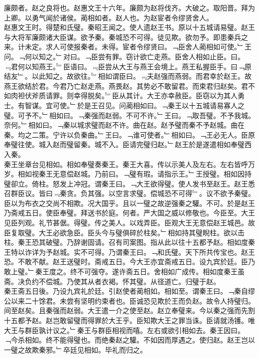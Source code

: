 \documentclass{zhvt-classic}
\begin{document}

\hspace*{2em}廉颇者。赵之良将也。赵惠文王十六年。廉颇为赵将伐齐。大破之。取阳晋。拜为上卿。以勇气闻於诸侯。蔺相如者。赵人也。为赵宦者令缪贤舍人。\\
\hspace*{2em}赵惠文王时。得楚和氏璧。秦昭王闻之。使人遗赵王书。原以十五城请易璧。赵王与大将军廉颇诸大臣谋。欲予秦。秦城恐不可得。徒见欺。欲勿予。即患秦兵之来。计未定。求人可使报秦者。未得。宦者令缪贤曰。﹁臣舍人蔺相如可使。﹂王问。﹁何以知之。﹂对曰。﹁臣尝有罪。窃计欲亡走燕。臣舍人相如止臣。曰。﹃君何以知燕王。﹄臣语曰。﹃臣尝从大王与燕王会境上。燕王私握臣手。曰﹁原结友﹂。以此知之。故欲往。﹄相如谓臣曰。﹃夫赵强而燕弱。而君幸於赵王。故燕王欲结於君。今君乃亡赵走燕。燕畏赵。其势必不敢留君。而束君归赵矣。君不如肉袒伏斧质请罪。则幸得脱矣。﹄臣从其计。大王亦幸赦臣。臣窃以为其人勇士。有智谋。宜可使。﹂於是王召见。问蔺相如曰。﹁秦王以十五城请易寡人之璧。可予不。﹂相如曰。﹁秦强而赵弱。不可不许。﹂王曰。﹁取吾璧。不予我城。奈何。﹂相如曰。﹁秦以城求璧而赵不许。曲在赵。赵予璧而秦不予赵城。曲在秦。均之二策。宁许以负秦曲。﹂王曰。﹁谁可使者。﹂相如曰。﹁王必无人。臣原奉璧往使。城入赵而璧留秦。城不入。臣请完璧归赵。﹂赵王於是遂遣相如奉璧西入秦。\\
\hspace*{2em}秦王坐章台见相如。相如奉璧奏秦王。秦王大喜。传以示美人及左右。左右皆呼万岁。相如视秦王无意偿赵城。乃前曰。﹁璧有瑕。请指示王。﹂王授璧。相如因持璧卻立。倚柱。怒发上冲冠。谓秦王曰。﹁大王欲得璧。使人发书至赵王。赵王悉召群臣议。皆曰﹃秦贪。负其强。以空言求璧。偿城恐不可得﹄。议不欲予秦璧。臣以为布衣之交尚不相欺。况大国乎。且以一璧之故逆强秦之驩。不可。於是赵王乃斋戒五日。使臣奉璧。拜送书於庭。何者。严大国之威以修敬也。今臣至。大王见臣列观。礼节甚倨。得璧。传之美人。以戏弄臣。臣观大王无意偿赵王城邑。故臣复取璧。大王必欲急臣。臣头今与璧俱碎於柱矣。﹂相如持其璧睨柱。欲以击柱。秦王恐其破璧。乃辞谢固请。召有司案图。指从此以往十五都予赵。相如度秦王特以诈详为予赵城。实不可得。乃谓秦王曰。﹁和氏璧。天下所共传宝也。赵王恐。不敢不献。赵王送璧时。斋戒五日。今大王亦宜斋戒五日。设九宾於廷。臣乃敢上璧。﹂秦王度之。终不可强夺。遂许斋五日。舍相如广成传。相如度秦王虽斋。决负约不偿城。乃使其从者衣褐。怀其璧。从径道亡。归璧于赵。\\
\hspace*{2em}秦王斋五日後。乃设九宾礼於廷。引赵使者蔺相如。相如至。谓秦王曰。﹁秦自缪公以来二十馀君。未尝有坚明约束者也。臣诚恐见欺於王而负赵。故令人持璧归。间至赵矣。且秦强而赵弱。大王遣一介之使至赵。赵立奉璧来。今以秦之强而先割十五都予赵。赵岂敢留璧而得罪於大王乎。臣知欺大王之罪当诛。臣请就汤镬。唯大王与群臣孰计议之。﹂秦王与群臣相视而嘻。左右或欲引相如去。秦王因曰。﹁今杀相如。终不能得璧也。而绝秦赵之驩。不如因而厚遇之。使归赵。赵王岂以一璧之故欺秦邪。﹂卒廷见相如。毕礼而归之。\\
\end{document}
